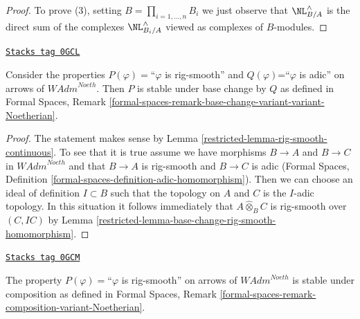 \begin{proof}
\medskip\noindent
To prove (3), setting $B = \prod_{i = 1, \ldots, n} B_i$
we just observe that $\NL_{B/A}^\wedge$ is the direct
sum of the complexes $\NL_{B_i/A}^\wedge$ viewed as complexes
of $B$-modules.
\end{proof}

\begin{lemma}
\label{restricted-lemma-base-change-rig-smooth-continuous}
\href{https://stacks.math.columbia.edu/tag/0GCL}{\texttt{Stacks tag 0GCL}}

Consider the properties $P(\varphi)=$``$\varphi$ is rig-smooth''
and $Q(\varphi)$=``$\varphi$ is adic'' on arrows of $\textit{WAdm}^{Noeth}$.
Then $P$ is stable under base change by $Q$ as defined in
Formal Spaces, Remark
\ref{formal-spaces-remark-base-change-variant-variant-Noetherian}.
\end{lemma}

\begin{proof}

The statement makes sense by Lemma \ref{restricted-lemma-rig-smooth-continuous}.
To see that it is true assume we have morphisms
$B \to A$ and $B \to C$ in $\textit{WAdm}^{Noeth}$
and that $B \to A$ is rig-smooth and $B \to C$ is adic
(Formal Spaces, Definition
\ref{formal-spaces-definition-adic-homomorphism}).
Then we can choose an ideal of definition $I \subset B$
such that the topology on $A$ and $C$ is the $I$-adic topology.
In this situation it follows immediately that
$A \widehat{\otimes}_B C$ is rig-smooth over $(C, IC)$ by
Lemma \ref{restricted-lemma-base-change-rig-smooth-homomorphism}.
\end{proof}

\begin{lemma}
\label{restricted-lemma-composition-rig-smooth-continuous}
\href{https://stacks.math.columbia.edu/tag/0GCM}{\texttt{Stacks tag 0GCM}}

The property $P(\varphi)=$``$\varphi$ is rig-smooth''
on arrows of $\textit{WAdm}^{Noeth}$ is stable under composition
as defined in Formal Spaces, Remark
\ref{formal-spaces-remark-composition-variant-Noetherian}.
\end{lemma}


